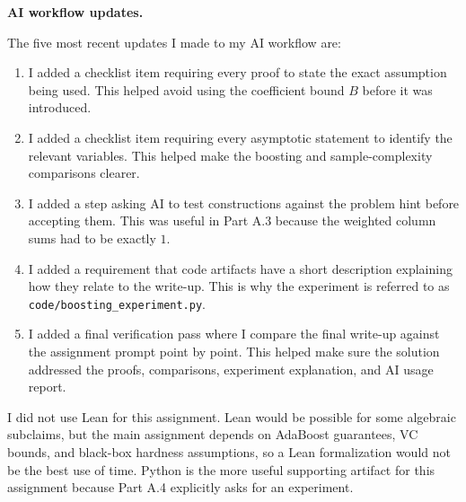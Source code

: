 \documentclass[11pt]{article}
\begin{document}
\begin{solutionbox}
\medskip

\textbf{AI workflow updates.}

The five most recent updates I made to my AI workflow are:

\begin{enumerate}[leftmargin=2em]
    \item I added a checklist item requiring every proof to state the exact assumption being used.
    This helped avoid using the coefficient bound $B$ before it was introduced.

    \item I added a checklist item requiring every asymptotic statement to identify the relevant
    variables. This helped make the boosting and sample-complexity comparisons clearer.

    \item I added a step asking AI to test constructions against the problem hint before accepting
    them. This was useful in Part A.3 because the weighted column sums had to be exactly $1$.

    \item I added a requirement that code artifacts have a short description explaining how they
    relate to the write-up. This is why the experiment is referred to as
    \texttt{code/boosting\_experiment.py}.

    \item I added a final verification pass where I compare the final write-up against the assignment
    prompt point by point. This helped make sure the solution addressed the proofs, comparisons,
    experiment explanation, and AI usage report.
\end{enumerate}

\medskip

I did not use Lean for this assignment. Lean would be possible for some algebraic subclaims, but the
main assignment depends on AdaBoost guarantees, VC bounds, and black-box hardness assumptions, so a
Lean formalization would not be the best use of time. Python is the more useful supporting artifact
for this assignment because Part A.4 explicitly asks for an experiment.
\end{solutionbox}
\end{document}
